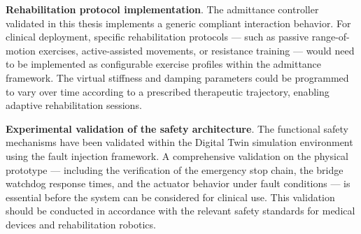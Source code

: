 \textbf{Rehabilitation protocol implementation}. The admittance controller validated in this thesis implements a generic compliant interaction behavior. For clinical deployment, specific rehabilitation protocols — such as passive range-of-motion exercises, active-assisted movements, or resistance training — would need to be implemented as configurable exercise profiles within the admittance framework. The virtual stiffness and damping parameters could be programmed to vary over time according to a prescribed therapeutic trajectory, enabling adaptive rehabilitation sessions.

\textbf{Experimental validation of the safety architecture}. The functional safety mechanisms have been validated within the Digital Twin simulation environment using the fault injection framework. A comprehensive validation on the physical prototype — including the verification of the emergency stop chain, the bridge watchdog response times, and the actuator behavior under fault conditions — is essential before the system can be considered for clinical use. This validation should be conducted in accordance with the relevant safety standards for medical devices and rehabilitation robotics.